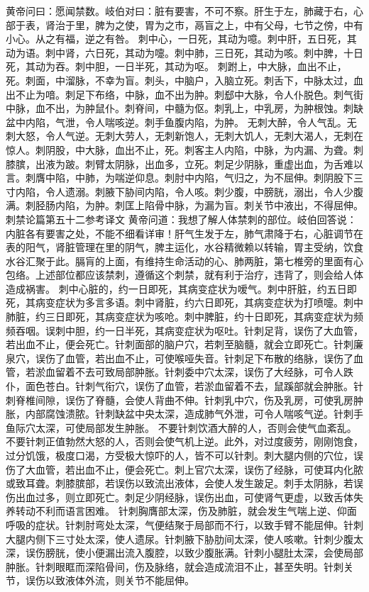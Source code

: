 \documentclass[a4paper,12pt,UTF8,twoside]{ctexbook}
\begin{document}
黄帝问曰：愿闻禁数。岐伯对曰：脏有要害，不可不察。肝生于左，肺藏于右，心部于表，肾治于里，脾为之使，胃为之市，鬲盲之上，中有父母，七节之傍，中有小心。从之有福，逆之有咎。
刺中心，一日死，其动为噫。刺中肝，五日死，其动为语。刺中肾，六日死，其动为嚏。刺中肺，三日死，其动为咳。刺中脾，十日死，其动为吞。刺中胆，一日半死，其动为呕。
刺跗上，中大脉，血出不止，死。刺面，中溜脉，不幸为盲。刺头，中脑户，入脑立死。刺舌下，中脉太过，血出不止为喑。刺足下布络，中脉，血不出为肿。刺郄中大脉，令人仆脱色。刺气街中脉，血不出，为肿鼠仆。刺脊间，中髓为伛。刺乳上，中乳房，为肿根蚀。刺缺盆中内陷，气泄，令人喘咳逆。刺手鱼腹内陷，为肿。
无刺大醉，令人气乱。无刺大怒，令人气逆。无刺大劳人，无刺新饱人，无刺大饥人，无刺大渴人，无刺在惊人。刺阴股，中大脉，血出不止，死。刺客主人内陷，中脉，为内漏、为聋。刺膝膑，出液为跛。刺臂太阴脉，出血多，立死。刺足少阴脉，重虚出血，为舌难以言。刺膺中陷，中肺，为喘逆仰息。刺肘中内陷，气归之，为不屈伸。刺阴股下三寸内陷，令人遗溺。刺腋下胁间内陷，令人咳。刺少腹，中膀胱，溺出，令人少腹满。刺胫肠内陷，为肿。刺匡上陷骨中脉，为漏为盲。刺关节中液出，不得屈伸。
刺禁论篇第五十二参考译文
黄帝问道：我想了解人体禁刺的部位。岐伯回答说：内脏各有要害之处，不能不细看详审！肝气生发于左，肺气肃降于右，心脏调节在表的阳气，肾脏管理在里的阴气，脾主运化，水谷精微赖以转输，胃主受纳，饮食水谷汇聚于此。膈肓的上面，有维持生命活动的心、肺两脏，第七椎旁的里面有心包络。上述部位都应该禁刺，遵循这个刺禁，就有利于治疗，违背了，则会给人体造成祸害。
刺中心脏的，约一日即死，其病变症状为嗳气。刺中肝脏，约五日即死，其病变症状为多言多语。刺中肾脏，约六日即死，其病变症状为打喷嚏。刺中肺脏，约三日即死，其病变症状为咳呛。刺中脾脏，约十日即死，其病变症状为频频吞咽。误刺中胆，约一日半死，其病变症状为呕吐。针刺足背，误伤了大血管，若出血不止，便会死亡。针刺面部的脑户穴，若刺至脑髓，就会立即死亡。针刺廉泉穴，误伤了血管，若出血不止，可使喉哑失音。针刺足下布散的络脉，误伤了血管，若淤血留着不去可致局部肿胀。针刺委中穴太深，误伤了大经脉，可令人跌仆，面色苍白。针刺气衔穴，误伤了血管，若淤血留着不去，鼠蹊部就会肿胀。针刺脊椎间隙，误伤了脊髓，会使人背曲不伸。针刺乳中穴，伤及乳房，可使乳房肿胀，内部腐蚀溃脓。针刺缺盆中央太深，造成肺气外泄，可令人喘咳气逆。针刺手鱼际穴太深，可使局部发生肿胀。
不要针刺饮酒大醉的人，否则会使气血紊乱。不要针刺正值勃然大怒的人，否则会使气机上逆。此外，对过度疲劳，刚刚饱食，过分饥饿，极度口渴，方受极大惊吓的人，皆不可以针刺。刺大腿内侧的穴位，误伤了大血管，若出血不止，便会死亡。刺上官穴太深，误伤了经脉，可使耳内化脓或致耳聋。刺膝膑部，若误伤以致流出液体，会使人发生跛足。刺手太阴脉，若误伤出血过多，则立即死亡。刺足少阴经脉，误伤出血，可使肾气更虚，以致舌体失养转动不利而语言困难。
针刺胸膺部太深，伤及肺脏，就会发生气喘上逆、仰面呼吸的症状。针刺肘弯处太深，气便结聚于局部而不行，以致手臂不能屈伸。针刺大腿内侧下三寸处太深，使人遗尿。针刺腋下胁肋间太深，使人咳嗽。针刺少腹太深，误伤膀胱，使小便漏出流入腹腔，以致少腹胀满。针刺小腿肚太深，会使局部肿胀。针刺眼眶而深陷骨间，伤及脉络，就会造成流泪不止，甚至失明。针刺关节，误伤以致液体外流，则关节不能屈伸。
\end{document}
